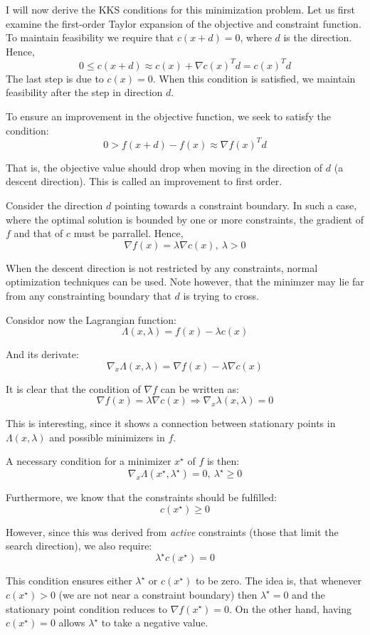\documentclass[10pt,oneside,a4paper,final,english]{memoir}
\begin{document}
I will now derive the KKS conditions for this minimization problem.
Let us first examine the first-order Taylor expansion of the objective
and constraint function. To maintain feasibility we require that
$c(x+d)=0$, where $d$ is the direction. Hence,
\[ 0 \leq c(x+d) \approx c(x) + \nabla c(x)^T d = c(x)^Td \]
The last step is due to $c(x) = 0$. When this condition is satisfied,
we maintain feasibility after the step in direction $d$.

To ensure an improvement in the objective function, we seek to satisfy
the condition:
\[ 0 > f(x + d) - f(x) \approx \nabla f(x)^T d\]

That is, the objective value should drop when moving in the direction
of $d$ (a descent direction). This is called an improvement to first
order.

Consider the direction $d$ pointing towards a constraint boundary. In
such a case, where the optimal solution is bounded by one or more
constraints, the gradient of $f$ and that of $c$ must be
parrallel. Hence,
\[ \nabla f(x) = \lambda \nabla c(x),\ \lambda > 0\]

When the descent direction is not restricted by any constraints,
normal optimization techniques can be used. Note however, that the
minimzer may lie far from any constrainting boundary that $d$ is
trying to cross.


Considor now the Lagrangian function:
\[ \Lambda (x, \lambda) = f(x) - \lambda c(x) \]

And its derivate:
\[ \nabla_x \Lambda(x, \lambda) = \nabla f(x) - \lambda \nabla
c(x) \]

It is clear that the condition of $\nabla f$ can be written as:
\[ \nabla f(x) = \lambda \nabla c(x) \Rightarrow
   \nabla_x \lambda(x, \lambda) = 0 \]

This is interesting, since it shows a connection between stationary
points in $\Lambda(x, \lambda)$ and possible minimizers in $f$.

A necessary condition for a minimizer $x^\star$ of $f$ is then:
\[ \nabla_x \Lambda(x^\star, \lambda^\star) = 0,\ \lambda^\star \geq
0 \]

Furthermore, we know that the constraints should be fulfilled:
\[c(x^\star) \geq 0\]

However, since this was derived from \textit{active} constraints
(those that limit the search direction), we also require:
\[ \lambda^\star c(x^\star) = 0 \]

This condition ensures either $\lambda^\star$ or $c(x^\star)$ to be
zero. The idea is, that whenever $c(x^\star) > 0$ (we are not near a
constraint boundary) then $\lambda^\star = 0$ and the stationary point
condition reduces to $\nabla f(x^\star) = 0$. On the other hand, having
$c(x^\star) = 0$ allows $\lambda^\star$ to take a negative value.
\end{document}
